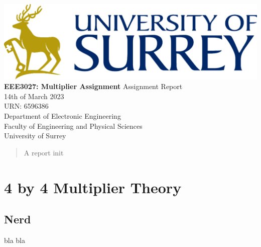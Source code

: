 \documentclass[11pt]{article}
\begin{document}
\begin{titlepage}
    \begin{center}
    \includegraphics[width=\textwidth]{Logo.png} %
    \vfill
    \Huge
    \textbf{EEE3027: Multiplier Assignment}
    \vfill
    \huge
    Assignment Report\\
    \vspace{1cm}
    \Large
    14th of March 2023\\
    URN: 6596386\\
    \vfill
    \vfill
    \Large
    Department of Electronic Engineering\\
    Faculty of Engineering and Physical Sciences\\
    University of Surrey\\
    \end{center}
\end{titlepage}

\begin{abstract}
A report init

\vspace{1cm}
\end{abstract}
\tableofcontents
\pagebreak

\section{4 by 4 Multiplier Theory}
\subsection{Nerd}
bla bla 
\end{document}

